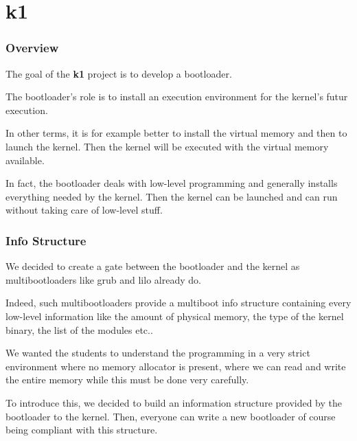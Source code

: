%
%

\section{k1}


\begin{frame}
  \frametitle{Overview}

  The goal of the \textbf{k1} project is to develop a bootloader.

  \nl

  The bootloader's role is to install an execution environment for the
  kernel's futur execution.

  \nl

  In other terms, it is for example better to install the virtual memory
  and then to launch the kernel. Then the kernel will be executed with the
  virtual memory available.

  \nl

  In fact, the bootloader deals with low-level programming and generally
  installs everything needed by the kernel. Then the kernel can be launched
  and can run without taking care of low-level stuff.
\end{frame}


\begin{frame}
  \frametitle{Info Structure}

  We decided to create a gate between the bootloader and the kernel as
  multibootloaders like grub and lilo already do.

  \nl

  Indeed, such multibootloaders provide a multiboot info structure containing
  every low-level information like the amount of physical memory, the type
  of the kernel binary, the list of the modules etc..

  \nl

  We wanted the students to understand the programming in a very strict
  environment where no memory allocator is present, where we can read and
  write the entire memory while this must be done very carefully.

  \nl

  To introduce this, we decided to build an information structure provided
  by the bootloader to the kernel. Then, everyone can write a new
  bootloader of course being compliant with this structure.
\end{frame}


